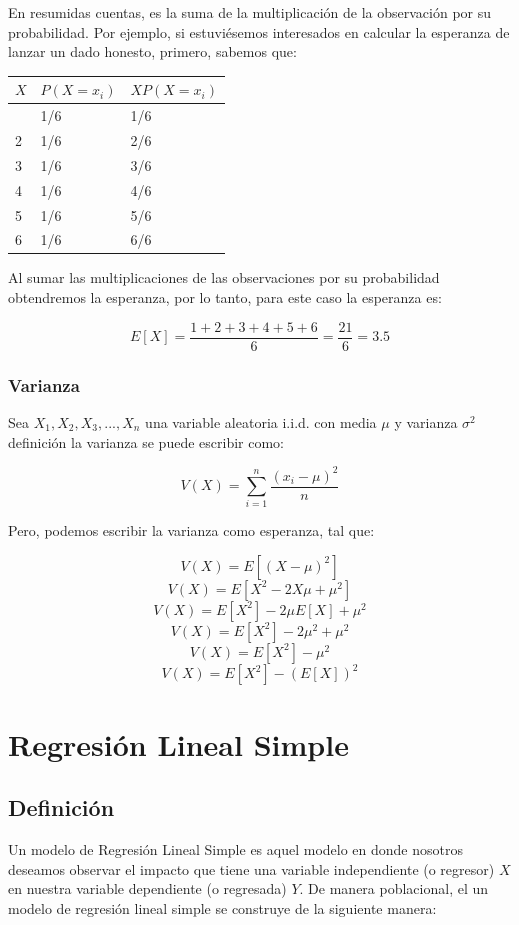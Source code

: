 \documentclass[
]{book}
\begin{document}
En resumidas cuentas, es la suma de la multiplicación de la observación por su probabilidad. Por ejemplo, si estuviésemos interesados en calcular la esperanza de lanzar un dado honesto, primero, sabemos que:

\begin{longtable}[]{@{}lll@{}}
\toprule\noalign{}
\(X\) & \(P(X = x_i)\) & \(XP(X = x_i)\) \\
\midrule\noalign{}
\endhead
\bottomrule\noalign{}
\endlastfoot
1 & 1/6 & 1/6 \\
2 & 1/6 & 2/6 \\
3 & 1/6 & 3/6 \\
4 & 1/6 & 4/6 \\
5 & 1/6 & 5/6 \\
6 & 1/6 & 6/6 \\
\end{longtable}

Al sumar las multiplicaciones de las observaciones por su probabilidad obtendremos la esperanza, por lo tanto, para este caso la esperanza es:

\[
E[X] = \frac{1+2+3+4+5+6}{6} = \frac{21}{6} = 3.5
\]

\subsection{Varianza}\label{varianza}

Sea \(X_1, X_2, X_3, ... , X_n\) una variable aleatoria i.i.d. con media \(\mu\) y varianza \(\sigma^2\) definición la varianza se puede escribir como:

\[
V(X) = \sum_{i = 1}^n \frac{(x_i -\mu)^2}{n}
\]

Pero, podemos escribir la varianza como esperanza, tal que:

\[
V(X) = E[(X - \mu)^2]
\]
\[
V(X) = E[X^2 - 2X\mu + \mu^2]
\]
\[
V(X) = E[X^2] - 2\mu E[X] + \mu^2
\]
\[
V(X) = E[X^2] - 2\mu^2 + \mu^2
\]
\[
V(X) = E[X^2] - \mu^2
\]
\[
V(X) = E[X^2] - (E[X])^2
\]

\chapter{Regresión Lineal Simple}\label{regresiuxf3n-lineal-simple}

\section{Definición}\label{definiciuxf3n}

Un modelo de Regresión Lineal Simple es aquel modelo en donde nosotros deseamos observar el impacto que tiene una variable independiente (o regresor) \(X\) en nuestra variable dependiente (o regresada) \(Y\). De manera poblacional, el un modelo de regresión lineal simple se construye de la siguiente manera:
\end{document}
